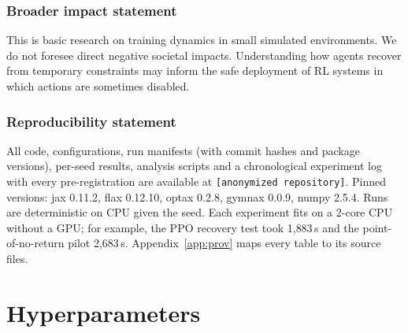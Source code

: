 \documentclass[10pt]{article} %
\newcommand{\repo}{\texttt{[anonymized repository]}}
\begin{document}
\subsubsection*{Broader impact statement}
This is basic research on training dynamics in small simulated environments. We do not foresee direct negative societal impacts. Understanding how agents recover from temporary constraints may inform the safe deployment of RL systems in which actions are sometimes disabled.

\subsubsection*{Reproducibility statement}
All code, configurations, run manifests (with commit hashes and package versions), per-seed results, analysis scripts and a chronological experiment log with every pre-registration are available at \repo. Pinned versions: jax 0.11.2, flax 0.12.10, optax 0.2.8, gymnax 0.0.9, numpy 2.5.4. Runs are deterministic on CPU given the seed. Each experiment fits on a 2-core CPU without a GPU; for example, the PPO recovery test took 1{,}883\,s and the point-of-no-return pilot 2{,}683\,s. Appendix~\ref{app:prov} maps every table to its source files.




\newpage
\appendix

\section{Hyperparameters}\label{app:hparams}
\end{document}
